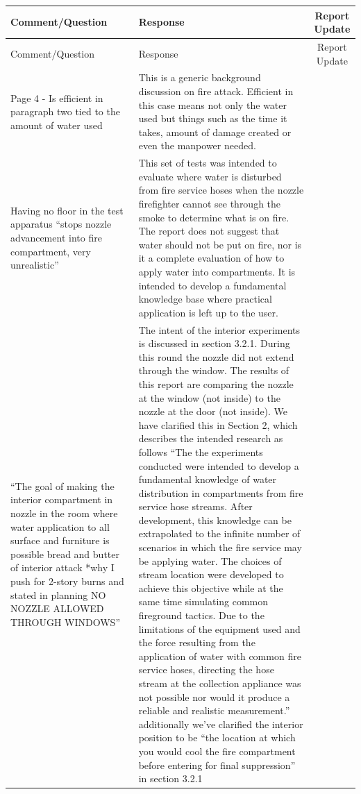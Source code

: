 \documentclass[12pt,oneside]{book}
\begin{document}
\begin{landscape}
\begin{longtable}{|L{4in}|L{3.75in}|c|}
		\hline
		Comment/Question & Response & Report Update \\ 
		\toprule[1.0pt] \endfirsthead
		\hline
		Comment/Question & Response & Report Update \\ 
		\toprule[1.0pt] \endhead
		\hline
		Page 4 - Is efficient in paragraph two tied to the amount of water used &
		This is a generic background discussion on fire attack. Efficient in this case means not only the water used but things such as the time it takes, amount of damage created or even the manpower needed. & \\
		
		\hline
		Having no floor in the test apparatus ``stops nozzle advancement into fire compartment, very unrealistic'' & 
		This set of tests was intended to evaluate where water is disturbed from fire service hoses when the nozzle firefighter cannot see through the smoke to determine what is on fire. The report does not suggest that water should not be put on fire, nor is it a complete evaluation of how to apply water into compartments. It is intended to develop a fundamental knowledge base where practical application is left up to the user. & \\

		\hline
		``The goal of making the interior compartment in nozzle in the room where water application to all surface and furniture is possible bread and butter of interior attack *why I push for 2-story burns and stated in planning NO NOZZLE ALLOWED THROUGH WINDOWS'' & 
		The intent of the interior experiments is discussed in section 3.2.1. During this round the nozzle did not extend through the window. The results of this report are comparing the nozzle at the window (not inside) to the nozzle at the door (not inside). We have clarified this in Section 2, which describes the intended research as follows ``The the experiments conducted were intended to develop a fundamental knowledge of water distribution in compartments from fire service hose streams. After development, this knowledge can be extrapolated to the infinite number of scenarios in which the fire service may be applying water. The choices of stream location were developed to achieve this objective while at the same time simulating common fireground tactics. Due to the limitations of the equipment used and the force resulting from the application of water with common fire service hoses, directing the hose stream at the collection appliance was not possible nor would it produce a reliable and realistic measurement.'' additionally we've clarified the interior position to be ``the location at which you would cool the fire compartment before entering for final suppression'' in section 3.2.1 & \checkmark\\


\end{longtable}
\end{landscape}
\end{document}
